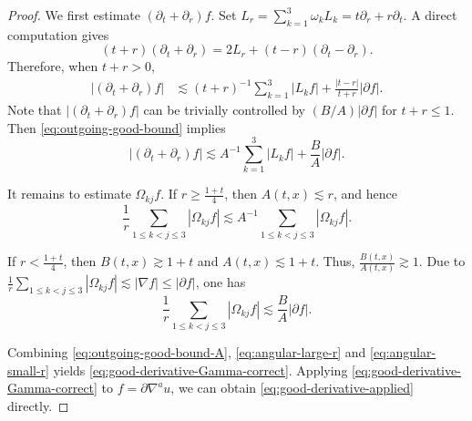 \documentclass[11pt,twoside]{article}
\def\ds{\displaystyle}
\def\ls{\lesssim}
\theoremstyle{plain}
\theoremstyle{definition}
\theoremstyle{assumption}
\numberwithin{equation}{section}
\begin{document}
	\begin{proof}
		We first estimate $(\partial_t+\partial_r)f$. Set
		$L_r=\ds\sum_{k=1}^3\omega_k L_k=t\partial_r+r\partial_t$.
		A direct computation gives
		\begin{equation}\label{eq:Tr-identity}
			(t+r)(\partial_t+\partial_r)
			=
			2L_r+(t-r)(\partial_t-\partial_r).
		\end{equation}
		Therefore, when $t+r>0$,
		\begin{equation}\label{eq:outgoing-good-bound}
			\begin{aligned}
				|(\partial_t+\partial_r)f|
				&\lesssim
				(t+r)^{-1}\sum_{k=1}^3|L_k f|
				+
				\frac{|t-r|}{t+r}|\partial f|.
			\end{aligned}
		\end{equation}
		Note that $|(\partial_t+\partial_r)f|$ can be trivially controlled by
			$(B/A)|\partial f|$ for $t+r\le1$. Then \eqref{eq:outgoing-good-bound} implies
		\begin{equation}\label{eq:outgoing-good-bound-A}
			|(\partial_t+\partial_r)f|
			\lesssim
			A^{-1}\sum_{k=1}^3|L_k f|
			+
			\frac{B}{A}|\partial f|.
		\end{equation}
		
		It remains to estimate $\Omega_{kj}f$.
		If	$r\ge \frac{1+t}{4}$,
		then $A(t,x)\lesssim r$,
		and hence
		\begin{equation}\label{eq:angular-large-r}
			\frac1r\sum_{1\le k<j\le3}|\Omega_{kj}f|
			\lesssim
			A^{-1}\sum_{1\le k<j\le3}|\Omega_{kj}f|.
		\end{equation}
		
		
		If	$r<\frac{1+t}{4}$,
		then $B(t,x)\gtrsim 1+t$ and $A(t,x)\lesssim 1+t$.
		Thus, $\frac{B(t,x)}{A(t,x)}\gtrsim1$.
		Due to $\frac1r\ds\sum_{1\le k<j\le3}|\Omega_{kj}f|\ls |\nabla f|\le |\partial f|$,
		 one has
		\begin{equation}\label{eq:angular-small-r}
			\frac1r\sum_{1\le k<j\le3}|\Omega_{kj}f|
			\lesssim
			\frac{B}{A}|\partial f|.
		\end{equation}
		
		
		Combining \eqref{eq:outgoing-good-bound-A}, \eqref{eq:angular-large-r}
		and \eqref{eq:angular-small-r} yields
		\eqref{eq:good-derivative-Gamma-correct}.
Applying \eqref{eq:good-derivative-Gamma-correct} to
		$f=\partial\nabla^a u$, we can obtain \eqref{eq:good-derivative-applied} directly.
	\end{proof}
	
	
	
	
	
\end{document}
